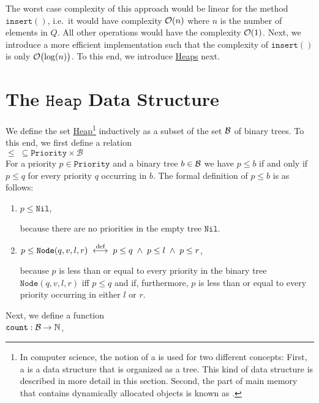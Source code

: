 The worst case complexity of this approach would be linear for the method $\mathtt{insert}()$,
i.e.~it would have complexity $\mathcal{O}(n)$ where $n$ is the number of elements in $Q$. 
All other operations would have the complexity $\mathcal{O}(1)$.  
Next, we introduce a more efficient implementation such that the complexity of $\mathtt{insert}()$ 
is only $\mathcal{O}\bigl(\log(n)\bigr)$.  To this end, we introduce
\href{https://en.wikipedia.org/wiki/Heap_(data_structure)}{Heaps} next. 

\section[Heaps]{The $\mathtt{Heap}$ Data Structure}
We define the set \href{https://en.wikipedia.org/wiki/Heap_(data_structure)}{Heap}\footnote{
In computer science, the notion of a  is used for two different concepts:
First, a  is a data structure that is organized as a tree.  This kind of data structure
is described in more detail in this section. Second, the part of main memory that contains dynamically
allocated objects is known as .}
inductively as a subset of the set $\mathcal{B}$ of binary trees.  To this end, we first define a relation
\\[0.2cm]
\hspace*{1.3cm}
$\leq \;\subseteq \mathtt{Priority}  \times \mathcal{B}$
\\[0.2cm]
For a priority $p \in \mathtt{Priority}$ and a binary tree $b \in \mathcal{B}$ we have  $p \leq b$ 
if and only if $p \leq q$ for every priority $q$ occurring in $b$.  The formal definition of 
$p \leq b$ is as follows:
\begin{enumerate}
\item $p \leq \mathtt{Nil}$,

      because there are no priorities in the empty tree $\mathtt{Nil}$.
\item $p \leq \mathtt{Node}(q,v,l,r) \;\stackrel{\mbox{\scriptsize def}}{\longleftrightarrow}\; p \leq q \;\wedge\; p \leq l \;\wedge\; p \leq r$,
         
      because $p$ is less than or equal to every priority in the binary tree 
      $\mathtt{Node}(q,v,l,r)$ iff  $p \leq q$ and if, furthermore, 
      $p$ is less than or equal to every priority occurring in either  $l$ or $r$.
\end{enumerate}
Next, we define a function \\[0.1cm]
\hspace*{1.3cm} $\mathtt{count}: \mathcal{B} \rightarrow \mathbb{N}$, \\[0.1cm]
